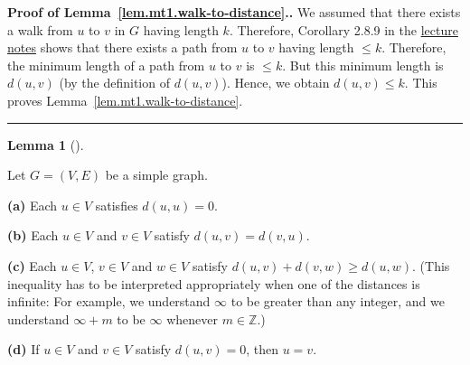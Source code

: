 \documentclass[numbers=enddot,12pt,final,onecolumn,notitlepage]{scrartcl}%
\theoremstyle{definition}
\newtheorem{lem}[theo]{Lemma}
\newenvironment{lemma}[1][]
{\begin{lem}[#1]\begin{leftbar}}
{\end{leftbar}\end{lem}}
\newenvironment{proof}[1][Proof]{\noindent\textbf{#1.} }{\ \rule{0.5em}{0.5em}}
\newcommand{\ZZ}{\mathbb{Z}}
\newcommand{\tup}[1]{\left( #1 \right)}
\begin{document}
\begin{proof}[Proof of Lemma~\ref{lem.mt1.walk-to-distance}.]
We assumed that there exists a walk from $u$ to $v$ in $G$ having
length $k$. Therefore, Corollary 2.8.9 in the
\href{http://www.cip.ifi.lmu.de/~grinberg/t/17s/nogra.pdf}{lecture notes}
shows that there exists a path from $u$ to $v$ having length
$\leq k$. Therefore, the minimum length of a path from $u$ to $v$
is $\leq k$. But this minimum length is $d \tup{u, v}$ (by the
definition of $d \tup{u, v}$). Hence, we obtain
$d \tup{u, v} \leq k$. This proves
Lemma~\ref{lem.mt1.walk-to-distance}.
\end{proof}

\begin{lemma} \label{lem.mt1.distances-metric}
Let $G = \tup{V, E}$ be a simple graph.

\textbf{(a)} Each $u \in V$ satisfies $d \tup{u, u} = 0$.

\textbf{(b)} Each $u \in V$ and $v \in V$ satisfy
$d \tup{u, v} = d \tup{v, u}$.

\textbf{(c)} Each $u \in V$, $v \in V$ and $w \in V$ satisfy
$d \tup{u, v} + d \tup{v, w} \geq d \tup{u, w}$.
(This inequality has to be interpreted appropriately when one of the
distances is infinite: For example, we understand $\infty$ to be
greater than any integer, and we understand $\infty + m$ to be
$\infty$ whenever $m \in \ZZ$.)

\textbf{(d)} If $u \in V$ and $v \in V$ satisfy $d \tup{u, v} = 0$,
then $u = v$.
\end{lemma}
\end{document}
